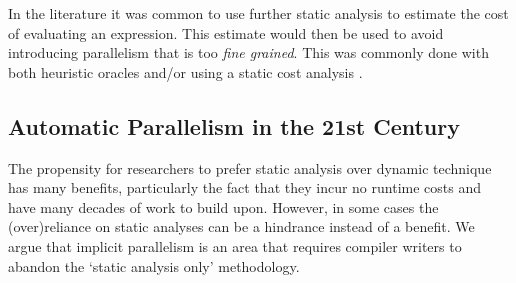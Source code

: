 In the literature it was common to use further static analysis to estimate the
cost of evaluating an expression. This estimate would then be used to avoid
introducing parallelism that is too \emph{fine grained}. This was commonly done
with both heuristic oracles and/or using a static cost analysis
\cite{hogen1992automatic} .

%
%
%

%


\subsection{Automatic Parallelism in the 21st Century}

The propensity for researchers to prefer static analysis over dynamic technique
has many benefits, particularly the fact that they incur no runtime costs and
have many decades of work to build upon. However, in some cases the
(over)reliance on static analyses can be a hindrance instead of a benefit. We
argue that implicit parallelism is an area that requires compiler writers to
abandon the `static analysis only' methodology.

